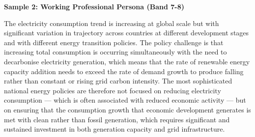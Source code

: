 \textbf{Sample 2: Working Professional Persona (Band 7-8)}

The electricity consumption trend is increasing at global scale but with significant variation in trajectory across countries at different development stages and with different energy transition policies. The policy challenge is that increasing total consumption is occurring simultaneously with the need to decarbonise electricity generation, which means that the rate of renewable energy capacity addition needs to exceed the rate of demand growth to produce falling rather than constant or rising grid carbon intensity. The most sophisticated national energy policies are therefore not focused on reducing electricity consumption — which is often associated with reduced economic activity — but on ensuring that the consumption growth that economic development generates is met with clean rather than fossil generation, which requires significant and sustained investment in both generation capacity and grid infrastructure.

\separator



